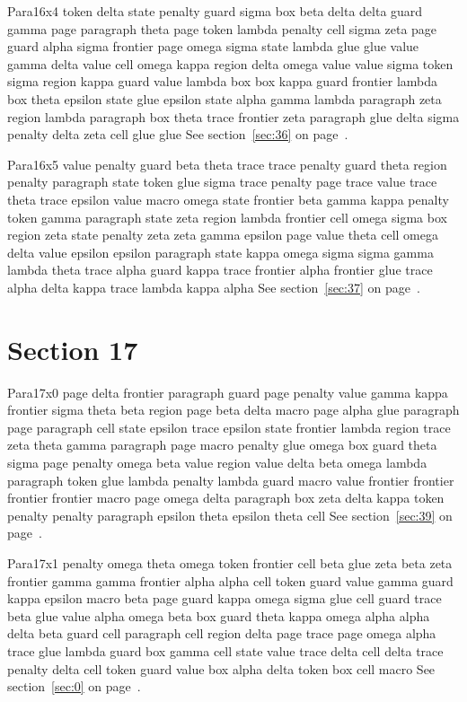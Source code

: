 \documentclass{article}
\begin{document}
Para16x4 token delta state penalty guard sigma box beta delta delta guard gamma page paragraph theta page token lambda penalty cell sigma zeta page guard alpha sigma frontier page omega sigma state lambda glue glue value gamma delta value cell omega kappa region delta omega value value sigma token sigma region kappa guard value lambda box box kappa guard frontier lambda box theta epsilon state glue epsilon state alpha gamma lambda paragraph zeta region lambda paragraph box theta trace frontier zeta paragraph glue delta sigma penalty delta zeta cell glue glue See section~\ref{sec:36} on page~\pageref{sec:12}.

Para16x5 value penalty guard beta theta trace trace penalty guard theta region penalty paragraph state token glue sigma trace penalty page trace value trace theta trace epsilon value macro omega state frontier beta gamma kappa penalty token gamma paragraph state zeta region lambda frontier cell omega sigma box region zeta state penalty zeta zeta gamma epsilon page value theta cell omega delta value epsilon epsilon paragraph state kappa omega sigma sigma gamma lambda theta trace alpha guard kappa trace frontier alpha frontier glue trace alpha delta kappa trace lambda kappa alpha See section~\ref{sec:37} on page~\pageref{sec:13}.

\section{Section 17}\label{sec:17}
Para17x0 page delta frontier paragraph guard page penalty value gamma kappa frontier sigma theta beta region page beta delta macro page alpha glue paragraph page paragraph cell state epsilon trace epsilon state frontier lambda region trace zeta theta gamma paragraph page macro penalty glue omega box guard theta sigma page penalty omega beta value region value delta beta omega lambda paragraph token glue lambda penalty lambda guard macro value frontier frontier frontier frontier macro page omega delta paragraph box zeta delta kappa token penalty penalty paragraph epsilon theta epsilon theta cell See section~\ref{sec:39} on page~\pageref{sec:11}.

Para17x1 penalty omega theta omega token frontier cell beta glue zeta beta zeta frontier gamma gamma frontier alpha alpha cell token guard value gamma guard kappa epsilon macro beta page guard kappa omega sigma glue cell guard trace beta glue value alpha omega beta box guard theta kappa omega alpha alpha delta beta guard cell paragraph cell region delta page trace page omega alpha trace glue lambda guard box gamma cell state value trace delta cell delta trace penalty delta cell token guard value box alpha delta token box cell macro See section~\ref{sec:0} on page~\pageref{sec:12}.
\end{document}
